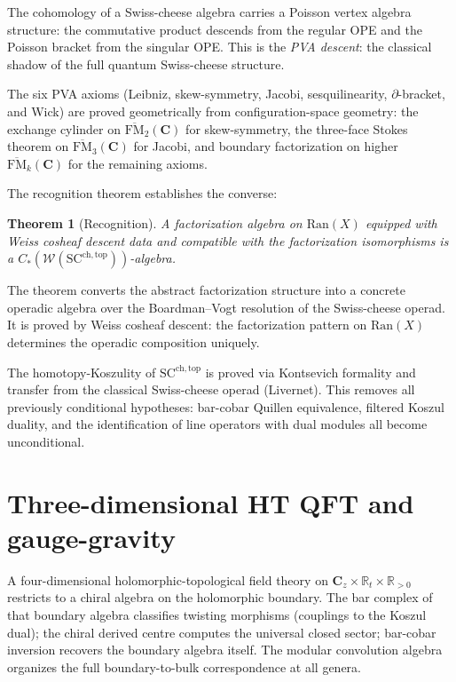\documentclass[11pt,reqno]{amsart}
\newtheorem{theorem}{Theorem}[section]
\theoremstyle{definition}
\theoremstyle{remark}
\newcommand{\Ran}{\mathrm{Ran}}
\newcommand{\FM}{\overline{\mathrm{FM}}}
\renewcommand{\Bbbk}{\mathbf{C}}
\numberwithin{equation}{section}
\begin{document}
The cohomology of a Swiss-cheese algebra carries a Poisson
vertex algebra structure: the commutative product descends
from the regular OPE and the Poisson bracket from the singular
OPE. This is the \emph{PVA descent}: the classical shadow of
the full quantum Swiss-cheese structure.

The six PVA axioms (Leibniz, skew-symmetry, Jacobi, sesqui\-linearity,
$\partial$-bracket, and Wick) are proved geometrically from
configuration-space geometry: the exchange cylinder on
$\FM_2(\Bbbk)$ for skew-symmetry, the three-face Stokes
theorem on $\FM_3(\Bbbk)$ for Jacobi, and boundary
factorization on higher $\FM_k(\Bbbk)$ for the remaining
axioms.

The recognition theorem establishes the converse:

\begin{theorem}[Recognition]
\label{thm:recognition}
A factorization algebra on\/ $\Ran(X)$ equipped with Weiss
cosheaf descent data and compatible with the factorization
isomorphisms is a $C_*(\mathcal{W}(\mathrm{SC}^{\mathrm{ch,top}}))$-algebra.
\end{theorem}

The theorem converts the abstract factorization structure
into a concrete operadic algebra over the Boardman--Vogt
resolution of the Swiss-cheese operad. It is proved by Weiss
cosheaf descent: the factorization pattern on $\Ran(X)$
determines the operadic composition uniquely.

The homotopy-Koszulity of $\mathrm{SC}^{\mathrm{ch,top}}$
is proved via Kontsevich formality and transfer from the
classical Swiss-cheese operad (Livernet). This removes all
previously conditional hypotheses: bar-cobar Quillen
equivalence, filtered Koszul duality, and the identification
of line operators with dual modules all become unconditional.


\section{Three-dimensional HT QFT and gauge-gravity}
\label{sec:ht-qft}

A four-dimensional holomorphic-topological field theory on
$\Bbbk_z \times \mathbb{R}_t \times \mathbb{R}_{>0}$
restricts to a chiral algebra on the holomorphic boundary.
The bar complex of that boundary algebra classifies
twisting morphisms (couplings to the Koszul dual); the
chiral derived centre computes the universal closed sector; bar-cobar
inversion recovers the boundary algebra itself. The modular
convolution algebra organizes the full boundary-to-bulk
correspondence at all genera.
\end{document}
